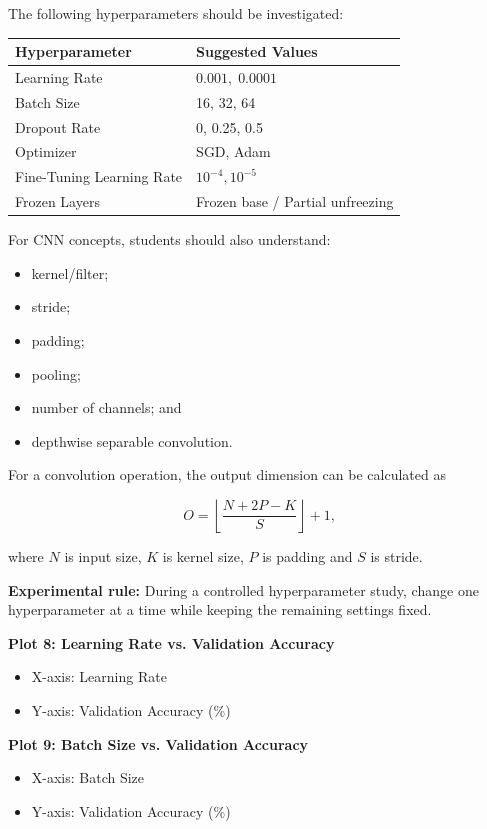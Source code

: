 \documentclass[10pt]{article}
\begin{document}
The following hyperparameters should be investigated:

\begin{center}
\begin{tabular}{|l|l|}
\hline
Hyperparameter & Suggested Values\\
\hline
Learning Rate & $0.001,\;0.0001$\\
Batch Size & 16, 32, 64\\
Dropout Rate & 0, 0.25, 0.5\\
Optimizer & SGD, Adam\\
Fine-Tuning Learning Rate & $10^{-4},10^{-5}$\\
Frozen Layers & Frozen base / Partial unfreezing\\
\hline
\end{tabular}
\end{center}

For CNN concepts, students should also understand:

\begin{itemize}
\item kernel/filter;
\item stride;
\item padding;
\item pooling;
\item number of channels; and
\item depthwise separable convolution.
\end{itemize}

For a convolution operation, the output dimension can be calculated as

\[
O=
\left\lfloor
\frac{N+2P-K}{S}
\right\rfloor+1,
\]

where $N$ is input size, $K$ is kernel size, $P$ is padding and $S$ is
stride.

\textbf{Experimental rule:} During a controlled hyperparameter study,
change one hyperparameter at a time while keeping the remaining settings
fixed.

\textbf{Plot 8: Learning Rate vs. Validation Accuracy}

\begin{itemize}
\item X-axis: Learning Rate
\item Y-axis: Validation Accuracy (\%)
\end{itemize}

\textbf{Plot 9: Batch Size vs. Validation Accuracy}

\begin{itemize}
\item X-axis: Batch Size
\item Y-axis: Validation Accuracy (\%)
\end{itemize}
\end{document}
